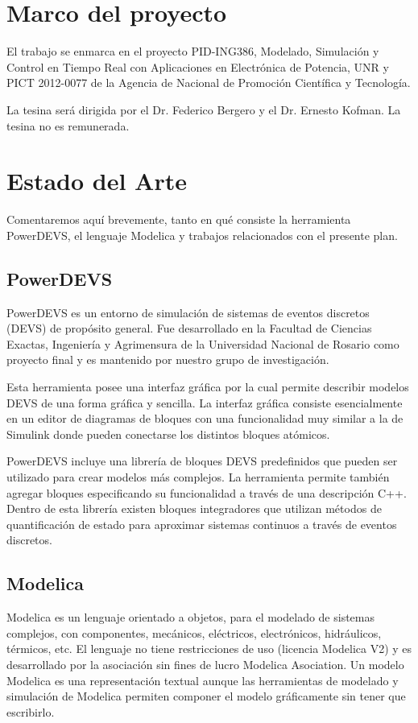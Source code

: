 \documentclass[a4paper,	11pt]{article}
\begin{document}
\newpage


\section{Marco del proyecto}
El trabajo se enmarca en el proyecto PID-ING386, Modelado, Simulación y Control en Tiempo Real con
Aplicaciones en Electrónica de Potencia, UNR y PICT 2012-0077 de la Agencia de Nacional de Promoción Científica y Tecnología.  

La tesina será dirigida por el Dr. Federico Bergero y el Dr. Ernesto Kofman. La tesina no es remunerada.

\section{Estado del Arte}
 Comentaremos aquí brevemente, tanto en qué consiste la herramienta PowerDEVS, el lenguaje Modelica y trabajos relacionados con el presente plan.
\subsection*{PowerDEVS}
         \label{powerdevs}
        
         PowerDEVS\cite{BK11} es un entorno de simulación de
         sistemas de eventos discretos (DEVS) de propósito general. Fue desarrollado
         en la Facultad de Ciencias Exactas, Ingeniería
         y Agrimensura de la Universidad Nacional de Rosario como proyecto
         final y es mantenido por nuestro grupo de investigación.
         
         Esta herramienta posee una interfaz gráfica por la cual permite describir modelos
          DEVS de una forma gráfica y sencilla. La interfaz gráfica consiste esencialmente
          en un editor de diagramas de bloques con una funcionalidad
          muy similar a la de Simulink donde pueden conectarse los distintos bloques atómicos. 
          
          PowerDEVS incluye una librería de bloques DEVS predefinidos que pueden ser utilizado
	  para crear modelos más complejos. La herramienta permite también agregar bloques
	  especificando su funcionalidad a través de una descripción C++. Dentro de esta librería	
	  existen bloques integradores que utilizan métodos de quantificación de estado \cite{Cel06}
	  para aproximar sistemas continuos a través de eventos discretos.
	  	  
 
\subsection*{Modelica}
         \label{modelica}
        Modelica \cite{Fri98} es un lenguaje orientado a objetos, para el modelado de sistemas complejos, con componentes, 
mecánicos, eléctricos, electrónicos, hidráulicos, térmicos, etc. El lenguaje no tiene restricciones de uso (licencia Modelica V2)
y es desarrollado por la asociación sin fines de lucro Modelica Asociation. Un modelo Modelica es una representación
textual aunque las herramientas de modelado y simulación de Modelica permiten componer el modelo gráficamente sin 
tener que escribirlo. 
\end{document}
